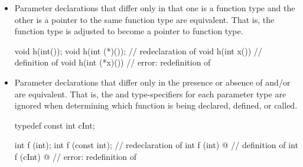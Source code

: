 \begin{note}
\begin{itemize}
\begin{example}
\begin{codeblock}
int g(char(*)[10]);
int g(char[5][10]);             // same as 
int g(char[7][10]);             // same as 
int g(char(*)[20]);             // different from 
\end{codeblock}
\end{example}

\item
{}%
%
Parameter declarations that differ only in that one is a function type
and the other is a pointer to the same function type are equivalent.
That is, the function type is adjusted to become a pointer to function type.
\begin{example}
\begin{codeblock}
void h(int());
void h(int (*)());              // redeclaration of 
void h(int x()) { }             // definition of 
void h(int (*x)()) { }          // error: redefinition of 
\end{codeblock}
\end{example}

\item
{}%
%
Parameter declarations that differ only in the presence or absence of
and/or
are equivalent.
That is, the
and
type-specifiers for
each parameter type are ignored when determining which function is being
declared,
defined, or called.
\begin{example}
\begin{codeblock}
typedef const int cInt;

int f (int);
int f (const int);              // redeclaration of 
int f (int) { @\commentellip@ }       // definition of 
int f (cInt) { @\commentellip@ }      // error: redefinition of 
\end{codeblock}
\end{example}


\end{itemize}
\end{note}
